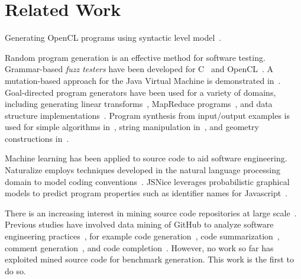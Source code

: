 \section{Related Work} \label{sec:rw}

Generating OpenCL programs using syntactic level model~\cite{Cummins2017a}.

Random program generation is an effective method for software testing. Grammar-based \emph{fuzz testers} have been developed for C~\cite{Yang2012} and OpenCL~\cite{Lidbury2015a}. A mutation-based approach for the Java Virtual Machine is demonstrated in~\cite{Chena}. Goal-directed program generators have been used for a variety of domains, including generating linear transforms~\cite{Voronenko2009}, MapReduce programs~\cite{Smith}, and data structure implementations~\cite{Loncaric2016}. Program synthesis from input/output examples is used for simple algorithms in~\cite{Zaremba2015a}, string manipulation in~\cite{Gulwani2011}, and geometry constructions in~\cite{Gulwani2012}.

Machine learning has been applied to source code to aid software engineering. Naturalize employs techniques developed in the natural language processing domain to model coding conventions~\cite{Allamanis2014a}. JSNice leverages probabilistic graphical models to predict program properties such as identifier names for Javascript~\cite{Raychev}.

There is an increasing interest in mining source code repositories at large scale~\cite{Allamanis2013a,White2015a,Bird2009}. Previous studies have involved data mining of GitHub to analyze software engineering practices~\cite{Wu2014,Guzman2014,Baishakhi2014a,Vasilescu2015}, for example code generation~\cite{Zhang2015a}, code summarization~\cite{Allamanis2016}, comment generation~\cite{Wong2013}, and code completion~\cite{Raychev2014}. However, no work so far has exploited mined source code for benchmark generation. This work is the first to do so.